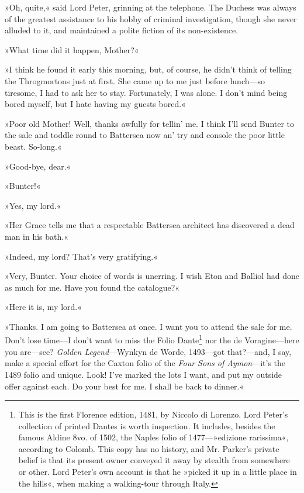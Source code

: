»Oh, quite,« said Lord Peter, grinning at the telephone. The Duchess was always of the greatest assistance to his hobby of criminal investigation, though she never alluded to it, and maintained a polite fiction of its non-existence.

»What time did it happen, Mother?«

»I think he found it early this morning, but, of course, he didn't think of telling the Throgmortons just at first. She came up to me just before lunch\allowbreak---\allowbreak so tiresome, I had to ask her to stay. Fortunately, I was alone. I don't mind being bored myself, but I hate having my guests bored.«

»Poor old Mother! Well, thanks awfully for tellin' me. I think I'll send Bunter to the sale and toddle round to Battersea now an' try and console the poor little beast. So-long.«

»Good-bye, dear.«

»Bunter!«

»Yes, my lord.«

»Her Grace tells me that a respectable Battersea architect has discovered a dead man in his bath.«

»Indeed, my lord? That's very gratifying.«

»Very, Bunter. Your choice of words is unerring. I wish Eton and Balliol had done as much for me. Have you found the catalogue?«

»Here it is, my lord.«

»Thanks. I am going to Battersea at once. I want you to attend the sale for me. Don't lose time\allowbreak---\allowbreak I don't want to miss the Folio Dante\footnote{This is the first Florence edition, 1481, by Niccolo di Lorenzo. Lord Peter's collection of printed Dantes is worth inspection. It includes, besides the famous Aldine 8vo. of 1502, the Naples folio of 1477—»edizione rarissima«, according to Colomb. This copy has no history, and Mr. Parker's private belief is that its present owner conveyed it away by stealth from somewhere or other. Lord Peter's own account is that he »picked it up in a little place in the hills«, when making a walking-tour through Italy.} nor the de Voragine\allowbreak---\allowbreak here you are\allowbreak---\allowbreak see? \textit{Golden Legend}---Wynkyn de Worde, 1493\allowbreak---\allowbreak got that?---and, I say, make a special effort for the Caxton folio of the \textit{Four Sons of Aymon}---it's the 1489 folio and unique. Look! I've marked the lots I want, and put my outside offer against each. Do your best for me. I shall be back to dinner.«

